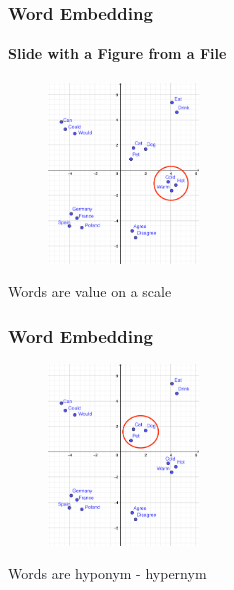 
\begin{frame}
	\frametitle{Word Embedding}
		\framesubtitle{Slide with a Figure from a File}

	\begin{figure}
		\includegraphics[width=4cm]{./figures/Group_scale}

	\end{figure}
		\begin{center}
		{Words are value on a scale}
		\end{center}
	\vspace{-0.5cm}

\end{frame}



\begin{frame}
	\frametitle{Word Embedding}

	\begin{figure}
		\includegraphics[width=4cm]{./figures/Group_hyponym}
	\end{figure}
		\begin{center}
		{Words are hyponym - hypernym}
		\end{center}
	\vspace{-0.5cm}

\end{frame}

